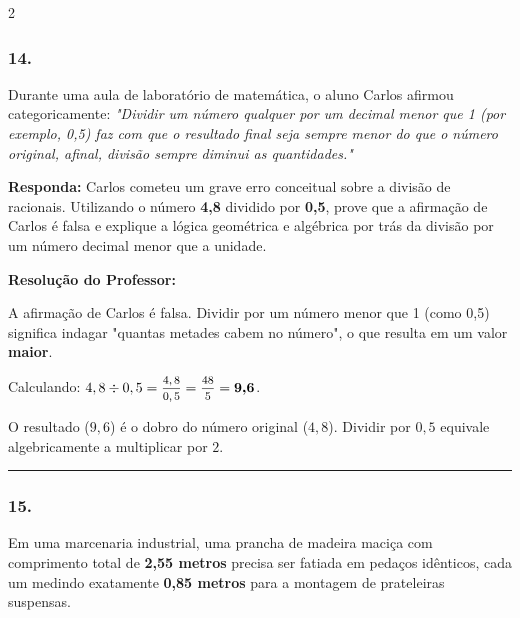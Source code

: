 \begin{multicols*}{2}
\subsubsection*{14.} Durante uma aula de laboratório de matemática, o aluno Carlos afirmou categoricamente: \textit{"Dividir um número qualquer por um decimal menor que 1 (por exemplo, 0,5) faz com que o resultado final seja sempre menor do que o número original, afinal, divisão sempre diminui as quantidades."}
\begin{boxresponda}
\textbf{Responda:} Carlos cometeu um grave erro conceitual sobre a divisão de racionais. Utilizando o número \textbf{4,8} dividido por \textbf{0,5}, prove que a afirmação de Carlos é falsa e explique a lógica geométrica e algébrica por trás da divisão por um número decimal menor que a unidade.
\end{boxresponda}

\ifgabarito
    \begin{tcolorbox}[colback=CorTitUm!5, colframe=CorTitUm, boxrule=1pt, arc=4pt, left=6pt, right=6pt, top=6pt, bottom=6pt]
    \small\textbf{\textcolor{CorTitUm}{Resolução do Professor:}}\par\vspace{0.1cm}
    \color{CinzaEscuro}
    A afirmação de Carlos é falsa. Dividir por um número menor que 1 (como 0,5) significa indagar "quantas metades cabem no número", o que resulta em um valor \textbf{maior}.
    
    Calculando: $4,8 \div 0,5 = \mfrac{4,8}{0,5} = \mfrac{48}{5} = \textbf{9,6}$.
    
    O resultado ($9,6$) é o dobro do número original ($4,8$). Dividir por $0,5$ equivale algebricamente a multiplicar por $2$.
    \end{tcolorbox}
\fi

\par\vspace{\espacoQuestao}

\noindent\textcolor{CorLinha}{\rule{\linewidth}{0.5pt}} 
\par\vspace{\espacoPreQuestao}
\subsubsection*{15.} Em uma marcenaria industrial, uma prancha de madeira maciça com comprimento total de \textbf{2,55 metros} precisa ser fatiada em pedaços idênticos, cada um medindo exatamente \textbf{0,85 metros} para a montagem de prateleiras suspensas.


\end{multicols*}
